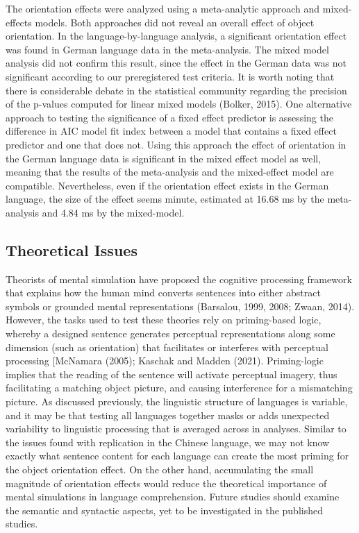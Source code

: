 \documentclass[
  man,floatsintext]{apa7}
\begin{document}
The orientation effects were analyzed using a meta-analytic approach and
mixed-effects models. Both approaches did not reveal an overall effect
of object orientation. In the language-by-language analysis, a
significant orientation effect was found in German language data in the
meta-analysis. The mixed model analysis did not confirm this result,
since the effect in the German data was not significant according to our
preregistered test criteria. It is worth noting that there is
considerable debate in the statistical community regarding the precision
of the p-values computed for linear mixed models (Bolker, 2015). One
alternative approach to testing the significance of a fixed effect
predictor is assessing the difference in AIC model fit index between a
model that contains a fixed effect predictor and one that does not.
Using this approach the effect of orientation in the German language
data is significant in the mixed effect model as well, meaning that the
results of the meta-analysis and the mixed-effect model are compatible.
Nevertheless, even if the orientation effect exists in the German
language, the size of the effect seems minute, estimated at 16.68 ms by
the meta-analysis and 4.84 ms by the mixed-model.

\hypertarget{theoretical-issues}{%
\subsection{Theoretical Issues}\label{theoretical-issues}}

Theorists of mental simulation have proposed the cognitive processing
framework that explains how the human mind converts sentences into
either abstract symbols or grounded mental representations
(Barsalou, 1999, 2008; Zwaan, 2014). However, the tasks used to test these theories
rely on priming-based logic, whereby a designed sentence generates
perceptual representations along some dimension (such as orientation)
that facilitates or interferes with perceptual processing
{[}McNamara (2005);
Kaschak and Madden (2021). Priming-logic implies that the reading
of the sentence will activate perceptual imagery, thus facilitating a
matching object picture, and causing interference for a mismatching
picture. As discussed previously, the linguistic structure of languages
is variable, and it may be that testing all languages together masks or
adds unexpected variability to linguistic processing that is averaged
across in analyses. Similar to the issues found with replication in the
Chinese language, we may not know exactly what sentence content for each
language can create the most priming for the object orientation effect.
On the other hand, accumulating the small magnitude of orientation
effects would reduce the theoretical importance of mental simulations in
language comprehension. Future studies should examine the semantic and
syntactic aspects, yet to be investigated in the published studies.
\end{document}
